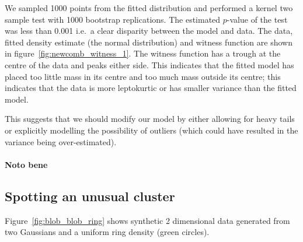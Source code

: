 \documentclass{article} %
\def\ie{i.e.\ }
\begin{document}
We sampled 1000 points from the fitted distribution and performed a kernel two sample test with 1000 bootstrap replications.
The estimated $p$-value of the test was less than 0.001 \ie a clear disparity between the model and data.
The data, fitted density estimate (the normal distribution) and witness function are shown in figure~\ref{fig:newcomb_witness_1}.
The witness function has a trough at the centre of the data and peaks either side.
This indicates that the fitted model has placed too little mass in its centre and too much mass outside its centre; this indicates that the data is more leptokurtic or has smaller variance than the fitted model.

This suggests that we should modify our model by either allowing for heavy tails or explicitly modelling the possibility of outliers (which could have resulted in the variance being over-estimated).

\paragraph{Noto bene}

\subsection{Spotting an unusual cluster}

Figure~\ref{fig:blob_blob_ring} shows synthetic 2 dimensional data generated from two Gaussians and a uniform ring density (green circles).
\end{document}

